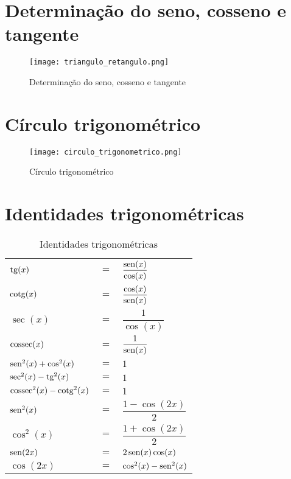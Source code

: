 \section{Determinação do seno, cosseno e tangente}
	\begin{figure}[H]
		\caption{Determinação do seno, cosseno e tangente}
		\label{triangulo_retangulo}
		\centering
		\texttt{[image: triangulo\_retangulo.png]}		
	\end{figure}
	
\section{Círculo trigonométrico}
	\begin{figure}[H]
		\caption{Círculo trigonométrico}
		\label{circulo_trigonometrico}
		\centering
		\texttt{[image: circulo\_trigonometrico.png]}		
	\end{figure}
	
\section{Identidades trigonométricas}
	\begin{table}[H]
		\caption{Identidades trigonométricas}
		\label{identidades_trigonometricas}
		\centering
		\begin{tabular}{|lcl|}
			$\operatorname{tg}(x)$                    & $=$ & $\dfrac{\operatorname{sen}(x)}{\cos(x)}$ \\
			$\operatorname{cotg}(x)$                  & $=$ & $\dfrac{\cos(x)}{\operatorname{sen}(x)}$ \\
			$\sec(x)$                   & $=$ & $\dfrac{1}{\cos(x)}$       \\
			$\operatorname{cossec}(x)$                & $=$ & $\dfrac{1}{\operatorname{sen}(x)}$       \\
			$\operatorname{sen}^2(x) + \cos^2(x)$     & $=$ & $1$                        \\
			$\sec^2(x) - \operatorname{tg}^2(x)$      & $=$ & $1$                        \\
			$\operatorname{cossec}^2(x) - \operatorname{cotg}^2(x)$ & $=$ & $1$                        \\
			$\operatorname{sen}^2(x)$                 & $=$ & $\dfrac{1 - \cos(2x)}{2}$  \\
			$\cos^2(x)$                 & $=$ & $\dfrac{1 + \cos(2x)}{2}$  \\
			$\operatorname{sen}(2x)$                  & $=$ & $2\operatorname{sen}(x)\cos(x)$          \\
			$\cos(2x)$                  & $=$ & $\cos^2(x) - \operatorname{sen}^2(x)$
		\end{tabular}		
	\end{table}
	
